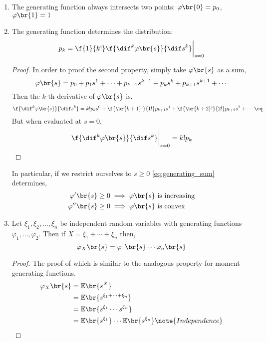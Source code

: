 \documentclass{article}
\newcommand{\Exp}{\mathbb{E}}
\begin{document}
    \begin{enumerate}
        \item The generating function always intersects two points: $\varphi\br{0} = p_0$, $\varphi\br{1} = 1$
        \item The generating function determines the distribution:
        \[ p_k = \f{1}{k!} \f{\dif^k \varphi \br{s}}{\dif s^k} \bigg|_{s=0} \]
        \begin{proof}
            In order to proof the second property, simply take $\varphi\br{s}$ as a sum,
            \[ \varphi\br{s} = p_0 + p_1 s^1 + \cdots + p_{k-1} s^{k-1}+ p_{k} s^{k}+ p_{k+1} s^{k+1} + \cdots \]
            Then the $k$-th derivative of $\varphi\br{s}$ is,
            \[ \f{\dif^k \varphi \br{s}}{\dif s^k} = k ! p_{k} s^{0} + \f{\br{k+1}!}{1!} p_{k+1} s^{1} + \f{\br{k+2}!}{2!} p_{k+2} s^{2} + \cdots \eq \label{eq:generating_sum}\]
            But when evaluated at $s = 0$,
            \[ \f{\dif^k \varphi \br{s}}{\dif s^k} \bigg|_{s=0} = k! p_k \]
        \end{proof}
        \begin{remark}
            In particular, if we restrict ourselves to $s \geq 0$ \cref{eq:generating_sum} determines,
            \begin{align*}
            \varphi'\br{s} \geq 0 &\implies \varphi\br{s} \text{ is increasing} \\
            \varphi''\br{s} \geq 0 &\implies \varphi\br{s} \text{ is convex} \\
            \end{align*}
        \end{remark}
        \item Let $\xi_1, \xi_2, \ldots, \xi_n$ be independent random variables with generating functions $\varphi_1, \ldots, \varphi_2$. Then if $X = \xi_1 + \cdots + \xi_n$ then,
        \[ \varphi_X\br{s} = \varphi_1 \br{s} \cdots \varphi_n \br{s} \]
        \begin{proof}
            The proof of which is similar to the analogous property for moment generating functions.
            \begin{align*}
                \varphi_X\br{s}
                &= \Exp\br{s^{X}}\\
                &= \Exp\br{s^{\xi_1 + \cdots + \xi_n}}\\
                &= \Exp\br{s^{\xi_1}\cdots s^{\xi_n}}\\
                &= \Exp\br{s^{\xi_1}}\cdots \Exp\br{s^{\xi_n}} \note{Independence}\\

\end{align*}
\end{proof}
\end{enumerate}
\end{document}
